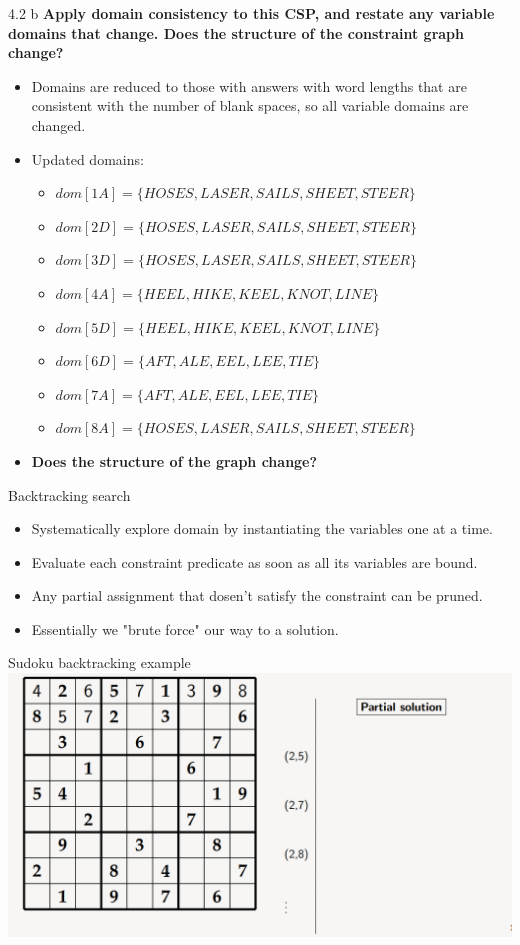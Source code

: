 \documentclass[11pt]{beamer}
\begin{document}
\begin{frame}{4.2 b}
\textbf{Apply domain consistency to this CSP, and restate any variable domains that change. Does the structure of the constraint graph change?}\pause
\begin{itemize}
	\item Domains are reduced to those with answers with word lengths that are consistent with the number of blank spaces, so all variable domains are changed.\pause
	\item Updated domains: \pause
	\begin{itemize}
		\item $dom[1A]=\{HOSES, LASER, SAILS, SHEET, STEER\}$\pause
		\item $dom[2D] = \{HOSES, LASER, SAILS, SHEET, STEER\}$
		\item $dom[3D] = \{HOSES, LASER, SAILS, SHEET, STEER\}$
		\item $dom[4A] = \{HEEL, HIKE, KEEL, KNOT, LINE\}$
		\item $dom[5D] = \{HEEL, HIKE, KEEL, KNOT, LINE\}$
		\item $dom[6D] = \{AFT,ALE,EEL,LEE,TIE\}$
		\item $dom[7A] = \{AFT,ALE,EEL,LEE,TIE\}$
		\item $dom[8A] = \{HOSES, LASER, SAILS, SHEET, STEER\}$
	\end{itemize}\pause
	\item \textbf{Does the structure of the graph change?}
\end{itemize}
\end{frame}

\begin{frame}{Backtracking search}
\pause
\begin{itemize}
	\item Systematically explore domain by instantiating the variables one at a time. \pause
	\item Evaluate each constraint predicate as soon as all its variables are bound.\pause
	\item Any partial assignment that dosen't satisfy the constraint can be pruned. \pause
	\item Essentially we "brute force" our way to a solution.
\end{itemize}
\end{frame}

\begin{frame}{Sudoku backtracking example}
\includegraphics[scale=0.3]{images/sudoku.png}
\end{frame}
\end{document}
